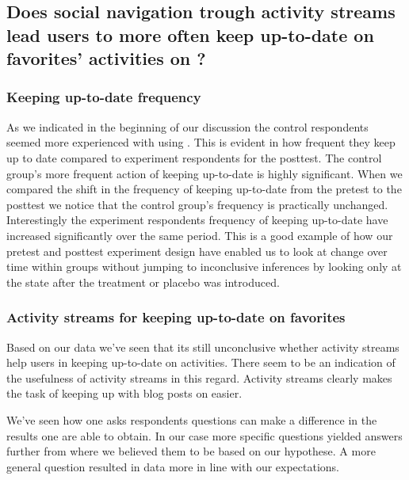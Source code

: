 \subsection{%
  Does social navigation trough activity streams lead users to more often keep
  up-to-date on favorites' activities on \urort{}?
}

\subsubsection{Keeping up-to-date frequency}

As we indicated in the beginning of our discussion the control respondents
seemed more experienced with using \urort{}. This is evident in how
frequent they keep up to date compared to experiment respondents for the
posttest.%
The control group's more frequent action of keeping up-to-date is highly
significant. When we compared the shift in the frequency of keeping up-to-date
from the pretest to the posttest%
we notice that the control group's frequency is practically unchanged.
Interestingly the experiment respondents frequency of keeping up-to-date have
increased significantly over the same period. This is a good example
of how our pretest and posttest experiment design have enabled us to look
at change over time within groups without jumping to inconclusive inferences
by looking only at the state after the treatment or placebo was introduced.

\subsubsection{Activity streams for keeping up-to-date on favorites}

Based on our data we've seen that its still unconclusive whether activity
streams help users in keeping up-to-date on activities. There seem to be an
indication of the usefulness of activity streams in this regard.
Activity streams clearly makes the task of keeping up with blog posts on
\urort{} easier.

We've seen how
one asks respondents questions can make a difference in the results one
are able to obtain. In our case more specific questions yielded answers
further from where we believed them to be based on our hypothese. A more
general question resulted in data more in line with our expectations.

